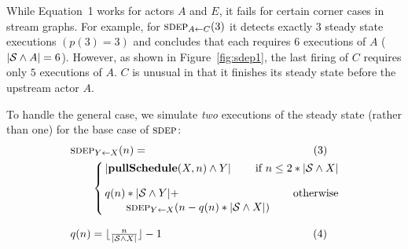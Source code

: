 \documentclass{sig-alternate}
\begin{document}
While Equation~1 works for actors $A$ and $E$, it fails for certain
corner cases in stream graphs.  For example, for $\sdepf{A}{C}(3)$ it
detects exactly 3 steady state executions $(p(3)=3)$ and concludes
that each requires $6$ executions of $A$ ($|{\cal S} \wedge A| = 6$).
However, as shown in Figure~\ref{fig:sdep1}, the last firing of
$C$ requires only $5$ executions of $A$.  $C$ is unusual in that it
finishes its steady state before the upstream actor $A$.

To handle the general case, we simulate {\it two} executions of the
steady state (rather than one) for the base case of $\textsc{sdep}$:
\begin{equation*}
\hspace{20pt}\begin{array}{l}
\hspace{-10pt}\sdepf{Y}{X}(n) = ~\hspace{2in}\hspace{2pt}(3)\\[1Ex]
\mbox{~}\hspace{6pt}
\left\{\begin{array}{lr}
\hspace{-3.5pt}|{\bf pullSchedule}(X, n) \wedge Y| & \hspace{-23pt} \mbox{if~} n \le 2*|{\cal S} \wedge X| \\[2.5Ex]
\hspace{-3.5pt}q(n) * |{\cal S} \wedge Y| + & \hspace{-23pt} \mbox{otherwise} \\[0.2Ex] %
\mbox{~}\hspace{12.5pt} \sdepf{Y}{X}(n - q(n) * |{\cal S} \wedge X|)
\end{array}
\right.~\\~\\
\hspace{-10pt}q(n) = \lfloor \frac{n}{|{\cal S} \wedge X|} \rfloor - 1  ~\hspace{1.83in}\hspace{2pt}(4)
\end{array}
\vspace{-2pt}
\end{equation*}
\end{document}
